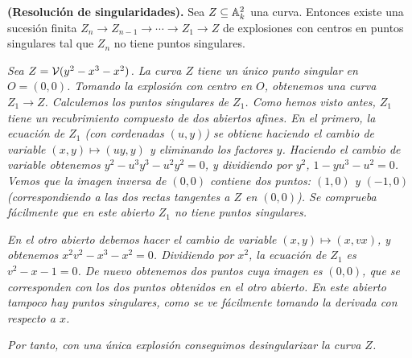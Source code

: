 \documentclass[ACGA.tex]{subfiles}
\begin{document}
\begin{teorema} {\bf (Resolución de singularidades).} Sea $Z\subseteq\mathbb{A}^2_k$ una curva. Entonces existe una sucesión finita $Z_n\to Z_{n-1}\to \cdots\to Z_1\to Z$ de explosiones con centros en puntos singulares tal que $Z_n$ no tiene puntos singulares. 
 \end{teorema}

\begin{ejs}
\emph{ Sea $Z=\mathcal{V}(y^2-x^3-x^2)$. La curva $Z$ tiene un único punto singular en $O=(0,0)$. Tomando la explosión con centro en $O$, obtenemos una curva $Z_1\to Z$. Calculemos los puntos singulares de $Z_1$. Como hemos visto antes, $Z_1$ tiene un recubrimiento compuesto de dos abiertos afines. En el primero, la ecuación de $Z_1$ (con cordenadas $(u,y)$) se obtiene haciendo el cambio de variable $(x,y)\mapsto (uy,y)$ y eliminando los factores $y$. Haciendo el cambio de variable obtenemos $y^2-u^3y^3-u^2y^2=0$, y dividiendo por $y^2$, $1-yu^3-u^2=0$. Vemos que la imagen inversa de $(0,0)$ contiene dos puntos: $(1,0)$ y $(-1,0)$ (correspondiendo a las dos rectas tangentes a $Z$ en $(0,0)$). Se comprueba fácilmente que en este abierto $Z_1$ no tiene puntos singulares.}

\emph{En el otro abierto debemos hacer el cambio de variable $(x,y)\mapsto (x,vx)$, y obtenemos $x^2v^2-x^3-x^2=0$. Dividiendo por $x^2$, la ecuación de $Z_1$ es $v^2-x-1=0$. De nuevo obtenemos dos puntos cuya imagen es $(0,0)$, que se corresponden con los dos puntos obtenidos en el otro abierto. En este abierto tampoco hay puntos singulares, como se ve fácilmente tomando la derivada con respecto a $x$.}

\emph{Por tanto, con una única explosión conseguimos desingularizar la curva $Z$.}
\end{ejs}
\end{document}
